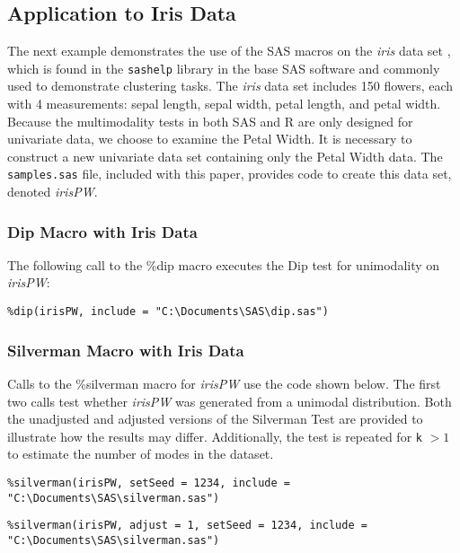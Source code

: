 \documentclass[]{interact}
\theoremstyle{plain}%
\theoremstyle{definition}
\theoremstyle{remark}
\begin{document}
\subsection{Application to Iris Data}\label{irisexample}
The next example demonstrates the use of the SAS macros on the {\it iris} data set \citep{fisher1936use}, which is found in the \texttt{sashelp} library in the base SAS software and commonly used to demonstrate clustering tasks. The {\it iris} data set includes 150 flowers, each with 4 measurements: sepal length, sepal width, petal length, and petal width. Because the multimodality tests in both SAS and R are only designed for univariate data, we choose to examine the Petal Width. %
It is necessary to construct a new univariate data set containing only the Petal Width data. %
The \texttt{samples.sas} file, included with this paper, provides code to create this data set, denoted {\it irisPW}. 


\subsubsection{Dip Macro with Iris Data}
The following call to the \%dip macro executes the Dip test for unimodality on {\it irisPW}:

\texttt{\%dip(irisPW, include = "C:\textbackslash Documents\textbackslash SAS\textbackslash dip.sas")}

\subsubsection{Silverman Macro with Iris Data}
Calls to the \%silverman macro for {\it irisPW} use the code shown below. The first two calls test whether {\it irisPW} was generated from a unimodal distribution. Both the unadjusted and adjusted versions of the Silverman Test are provided to %
illustrate how the results may differ. Additionally, the test is repeated for \texttt{k} $> 1$ to estimate the number of modes in the dataset.

\texttt{\%silverman(irisPW, setSeed = 1234, include = \\ "C:\textbackslash Documents\textbackslash SAS\textbackslash silverman.sas")}

\texttt{\%silverman(irisPW, adjust = 1, setSeed = 1234, include = "C:\textbackslash Documents\textbackslash SAS\textbackslash silverman.sas")}
\end{document}
